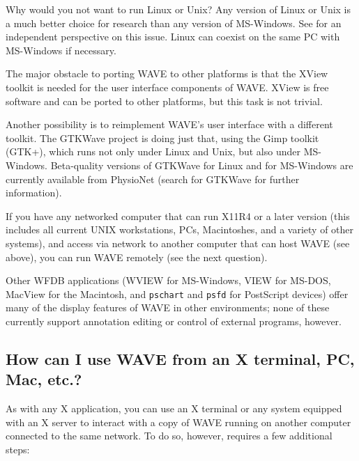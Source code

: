 \documentclass[twoside]{book}
\newcommand{\WAVE}{{\sf WAVE}\xspace}
\begin{document}
Why would you not want to run Linux or Unix?  Any version of Linux or Unix is a
much better choice for research than any version of MS-Windows. See
for an independent perspective on this issue.  Linux can coexist on the same PC
with MS-Windows if necessary.

The major obstacle to porting \WAVE{} to other platforms is that the XView
toolkit is needed for the user interface components of \WAVE{}.  XView is free
software and can be ported to other platforms, but this task is not trivial.

Another possibility is to reimplement \WAVE{}'s user interface with a different
toolkit.  The {\sf GTKWave} project is doing just that, using the Gimp toolkit
(GTK+), which runs not only under Linux and Unix, but also under MS-Windows.
Beta-quality versions of {\sf GTKWave} for Linux and for MS-Windows are
currently available from PhysioNet (search for {\sf GTKWave} for further
information).

If you have any networked computer that can run X11R4 or a later version
(this includes all current UNIX workstations, PCs, Macintoshes, and a variety
of other systems), and access via network to another computer that can host
\WAVE{} (see above), you can run \WAVE{} remotely (see the next question).

Other WFDB applications ({\sf WVIEW} for MS-Windows, {\sf VIEW} for
MS-DOS, {\sf MacView} for the Macintosh, and {\tt pschart} and {\tt psfd} for
PostScript devices) offer many of the display features of \WAVE{} in other
environments;  none of these currently support annotation editing or control
of external programs, however.

\subsection{How can I use \WAVE{} from an X terminal, PC, Mac, etc.?}

As with any X application, you can use an X terminal or any system equipped
with an X server to interact with a copy of \WAVE{} running on another computer
connected to the same network.  To do so, however, requires a few additional
steps:
\end{document}
